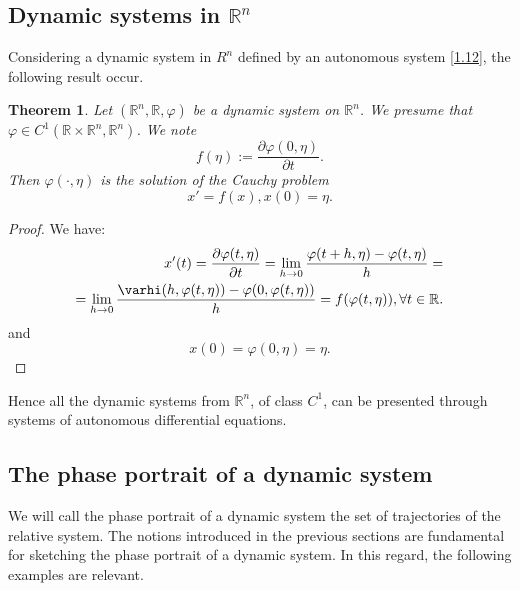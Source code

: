 \documentclass[a4paper,11pt]{report}
\newtheorem{theorem}{Theorem}[subsection]
\newcommand{\R}{\mathbb{R}}
\begin{document}
\subsection{Dynamic systems in $\R^{n}$}
 Considering a dynamic system in $R^{n}$ defined by an autonomous system \eqref{1.12}, the following result occur.
 \begin{theorem}
  Let $(\R^{n},\R,\varphi)$ be a dynamic system on $\R^{n}$. We presume that $\varphi\in C^{1}(\R\times\R^{n},\R^{n})$. We note $$f(\eta):=\frac{\partial \varphi(0,\eta)}{\partial t}.$$ Then $\varphi(\cdot,\eta)$ is the solution of the Cauchy problem 
  \begin{equation}\label{1.14}
   x'=f(x),x(0)=\eta.
  \end{equation}

 \end{theorem}
\begin{proof}
 We have:
 \begin{align*}
  x'(t)=\frac{\partial \varphi(t,\eta)}{\partial t}=\lim_{h\rightarrow 0}\frac{\varphi(t+h,\eta)-\varphi(t,\eta)}{h}=\\
  =\lim_{h\rightarrow 0}\frac{\varhi(h,\varphi(t,\eta))-\varphi(0,\varphi(t,\eta))}{h}=f(\varphi(t,\eta)), \forall t\in \R.  
 \end{align*}
and $$x(0)=\varphi(0,\eta)=\eta.$$
\end{proof}
Hence all the dynamic systems from $\R^{n}$, of class $C^{1}$, can be presented through systems of autonomous differential equations.
\subsection{The phase portrait of a dynamic system}
 We will call the phase portrait of a dynamic system the set of trajectories of the relative system. The notions introduced in the previous sections are fundamental for sketching the phase portrait of a dynamic system. In this regard, the following examples are relevant.
\end{document}
